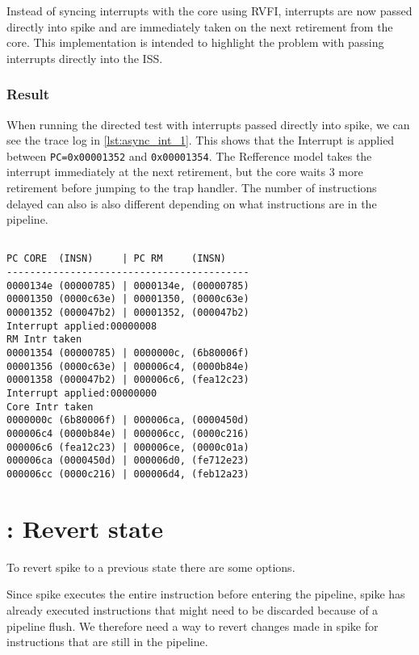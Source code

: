 Instead of syncing interrupts with the core using RVFI, interrupts are now passed directly into spike and are immediately taken on the next retirement from the core. This implementation is intended to highlight the problem with passing interrupts directly into the ISS.

\subsubsection{Result}

When running the directed test with interrupts passed directly into spike, we can see the trace log in \cref{lst:async_int_1}. This shows that the Interrupt is applied between \lstinline{PC=0x00001352} and \lstinline{0x00001354}. The Refference model takes the interrupt immediately at the next retirement, but the core waits 3 more retirement before jumping to the trap handler. The number of instructions delayed can also is also different depending on what instructions are in the pipeline.

\begin{lstlisting}[label={lst:async_int_1},caption={Trace output from asynchronous interrupts without pipeline shell}]

PC CORE  (INSN)     | PC RM     (INSN)
------------------------------------------
0000134e (00000785) | 0000134e, (00000785) 
00001350 (0000c63e) | 00001350, (0000c63e) 
00001352 (000047b2) | 00001352, (000047b2) 
Interrupt applied:00000008
RM Intr taken
00001354 (00000785) | 0000000c, (6b80006f) 
00001356 (0000c63e) | 000006c4, (0000b84e) 
00001358 (000047b2) | 000006c6, (fea12c23) 
Interrupt applied:00000000
Core Intr taken
0000000c (6b80006f) | 000006ca, (0000450d) 
000006c4 (0000b84e) | 000006cc, (0000c216) 
000006c6 (fea12c23) | 000006ce, (0000c01a) 
000006ca (0000450d) | 000006d0, (fe712e23) 
000006cc (0000c216) | 000006d4, (feb12a23) 
\end{lstlisting}


\section{: Revert state}

To revert spike to a previous state there are some options.

Since spike executes the entire instruction before entering the pipeline, spike has already executed instructions that might need to be discarded because of a pipeline flush. We therefore need a way to revert changes made in spike for instructions that are still in the pipeline.

